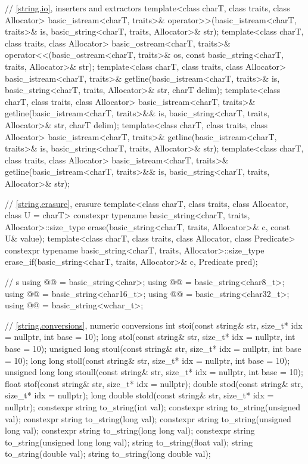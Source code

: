 \begin{codeblock}
{  // \ref{string.io}, inserters and extractors
  template<class charT, class traits, class Allocator>
    basic_istream<charT, traits>&
      operator>>(basic_istream<charT, traits>& is,
                 basic_string<charT, traits, Allocator>& str);
  template<class charT, class traits, class Allocator>
    basic_ostream<charT, traits>&
      operator<<(basic_ostream<charT, traits>& os,
                 const basic_string<charT, traits, Allocator>& str);
  template<class charT, class traits, class Allocator>
    basic_istream<charT, traits>&
      getline(basic_istream<charT, traits>& is,
              basic_string<charT, traits, Allocator>& str,
              charT delim);
  template<class charT, class traits, class Allocator>
    basic_istream<charT, traits>&
      getline(basic_istream<charT, traits>&& is,
              basic_string<charT, traits, Allocator>& str,
              charT delim);
  template<class charT, class traits, class Allocator>
    basic_istream<charT, traits>&
      getline(basic_istream<charT, traits>& is,
              basic_string<charT, traits, Allocator>& str);
  template<class charT, class traits, class Allocator>
    basic_istream<charT, traits>&
      getline(basic_istream<charT, traits>&& is,
              basic_string<charT, traits, Allocator>& str);

  // \ref{string.erasure}, erasure
  template<class charT, class traits, class Allocator, class U = charT>
    constexpr typename basic_string<charT, traits, Allocator>::size_type
      erase(basic_string<charT, traits, Allocator>& c, const U& value);
  template<class charT, class traits, class Allocator, class Predicate>
    constexpr typename basic_string<charT, traits, Allocator>::size_type
      erase_if(basic_string<charT, traits, Allocator>& c, Predicate pred);

  //  s
  using @@    = basic_string<char>;
  using @@  = basic_string<char8_t>;
  using @@ = basic_string<char16_t>;
  using @@ = basic_string<char32_t>;
  using @@   = basic_string<wchar_t>;

  // \ref{string.conversions}, numeric conversions
  int stoi(const string& str, size_t* idx = nullptr, int base = 10);
  long stol(const string& str, size_t* idx = nullptr, int base = 10);
  unsigned long stoul(const string& str, size_t* idx = nullptr, int base = 10);
  long long stoll(const string& str, size_t* idx = nullptr, int base = 10);
  unsigned long long stoull(const string& str, size_t* idx = nullptr, int base = 10);
  float stof(const string& str, size_t* idx = nullptr);
  double stod(const string& str, size_t* idx = nullptr);
  long double stold(const string& str, size_t* idx = nullptr);
  constexpr string to_string(int val);
  constexpr string to_string(unsigned val);
  constexpr string to_string(long val);
  constexpr string to_string(unsigned long val);
  constexpr string to_string(long long val);
  constexpr string to_string(unsigned long long val);
  string to_string(float val);
  string to_string(double val);
  string to_string(long double val);

}
\end{codeblock}
